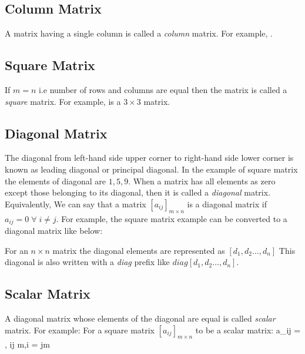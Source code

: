 \subsection{Column Matrix}
A matrix having a single column is called a {\it column} matrix. For example, \startformula \startbmatrix{}\NR{}\NR{}\NR{}\NR\stopbmatrix .\stopformula

\subsection{Square Matrix}
If $m = n$ i.e number of rows and columns are equal then the matrix is called a {\it square} matrix. For example,
\startformula \startbmatrix{}   \NR{}   \NR{}  \NR\stopbmatrix \stopformula is a $3\times 3$ matrix.

\subsection{Diagonal Matrix}
The diagonal from left-hand side upper corner to right-hand side lower corner is known as leading diagonal or principal diagonal. In the example of square
matrix the elements of diagonal are $1, 5, 9$. When a matrix has all elements as zero except those belonging to its diagonal, then
it is called a {\it diagonal} matrix. Equivalently, We can say that a matrix $[a_{ij}]_{m\times n}$ is a diagonal matrix if $a_{ij} =
0\;\forall\;i\neq j$. For example, the square matrix example can be converted to a diagonal matrix like below:

\startformula \startbmatrix{}   \NR{}   \NR{}  \NR\stopbmatrix \stopformula

For an $n\times n$ matrix the diagonal elements are represented as $[d_1, d_2 \ldots, d_n]$ This diagonal is also written with a
{\it diag} prefix like $diag [d_1, d_2 \ldots, d_n]$.

\subsection{Scalar Matrix}
A diagonal matrix whose elements of the diagonal are equal is called {\it scalar} matrix. For example:
\startformula\startbmatrix{}   \NR{}   \NR{}  \NR\stopbmatrix \stopformula
For a square matrix $[a_{ij}]_{m\times n}$ to be a scalar matrix:
\startformula a_{ij} = \startmathcases{}, \NC i\neq j \NR\NC m,\NC i = j\NR\stopmathcases\;\forall\;m\stopformula

